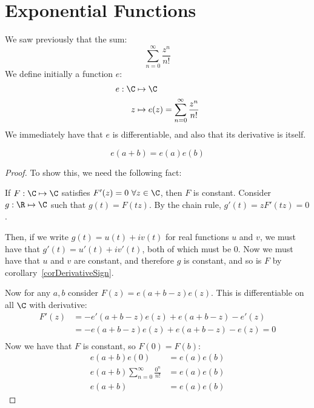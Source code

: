 \documentclass[../Main.tex]{subfiles}
\begin{document}
\section{Exponential Functions}
We saw previously that the sum:
\begin{equation*}
    \sum_{n = 0}^\infty \frac{z^n}{n!}
\end{equation*}
We define initially a function $e$:
\begin{align*}
    e : \C &\mapsto \C \\
    z &\mapsto e(z) = \sum_{n = 0}^\infty \frac{z^n}{n!}
\end{align*}
We immediately have that $e$ is differentiable, and also that its derivative is itself.
\begin{proposition}
    \begin{equation*}
        e(a + b) = e(a) e(b)
    \end{equation*}
    \label{propExpAdditivity}
\end{proposition}
\begin{proof}
    To show this, we need the following fact:\par
    \begin{subproof}{If $F : \C \mapsto \C$ satisfies $F'(z) = 0~\forall z \in \C$, then $F$ is constant.}
        Consider $g : \R \mapsto \C$ such that $g(t) = F(tz)$. By the chain rule, $g'(t) = zF'(tz) = 0$.\par
        Then, if we write $g(t) = u(t) + iv(t)$ for real functions $u$ and $v$, we must have that $g'(t) = u'(t) + iv'(t)$, both of which must be 0. Now we must have that $u$ and $v$ are constant, and therefore $g$ is constant, and so is $F$ by corollary~\ref{corDerivativeSign}.
    \end{subproof}
    Now for any $a, b$ consider $F(z) = e(a + b - z) e(z)$. This is differentiable on all $\C$ with derivative:
    \begin{align*}
        F'(z) &= -e'(a + b - z) e(z) + e(a + b - z) - e'(z) \\
        &= -e(a + b - z) e(z) + e(a + b - z) - e(z) = 0\\
    \end{align*}
    Now we have that $F$ is constant, so $F(0) = F(b)$:
    \begin{align*}
        e(a + b) e(0) &= e(a) e(b) \\
        e(a + b) \sum_{n = 0}^\infty \frac{0^n}{n!} &= e(a) e(b) \\
        e(a + b) &= e(a) e(b)
    \end{align*}
\end{proof}
\end{document}
